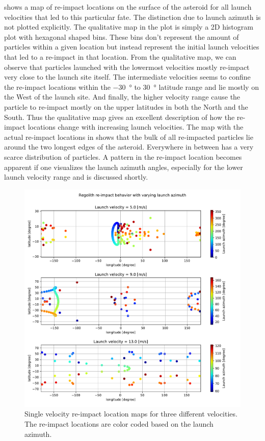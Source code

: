  shows a map of re-impact locations on the surface of the asteroid for all launch velocities that led to this particular fate. The distinction due to launch azimuth is not plotted explicitly. The qualitative map in the plot is simply a 2D histogram plot with hexagonal shaped bins. These bins don't represent the amount of particles within a given location but instead represent the initial launch velocities that led to a re-impact in that location. From the qualitative map, we can observe that particles launched with the lowermost velocities mostly re-impact very close to the launch site itself. The intermediate velocities seems to confine the re-impact locations within the \SI{-30}{\degree} to \SI{+30}{\degree} latitude range and lie mostly on the West of the launch site. And finally, the higher velocity range cause the particle to re-impact mostly on the upper latitudes in both the North and the South. Thus the qualitative map gives an excellent description of how the re-impact locations change with increasing launch velocities. The map with the actual re-impact locations in  shows that the bulk of all re-impacted particles lie around the two longest edges of the asteroid. Everywhere in between has a very scarce distribution of particles. A pattern in the re-impact location becomes apparent if one visualizes the launch azimuth angles, especially for the lower launch velocity range and is discussed shortly.
\begin{figure}[htb]
\centering
\captionsetup{justification=centering}
\includegraphics[width=\textwidth, height=0.6\textheight, keepaspectratio=true]{Images/longest_edge_no_perturbations/re-impact_behavior_with_azimuth.pdf}
\caption{Single velocity re-impact location maps for three different velocities. The re-impact locations are color coded based on the launch azimuth.}
\label{fig:crashmap_launchAzimuth_noSP}
\end{figure}
